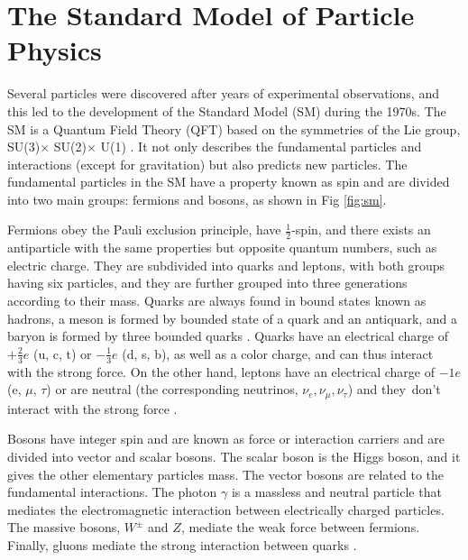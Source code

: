 \chapter{\leavevmode\newline The Standard Model of Particle Physics}
\label{chap:chapter_1}
Several particles were discovered after years of experimental observations, and this led to the development of the Standard Model (SM) during the 1970s. The SM is a Quantum Field Theory (QFT) based on the symmetries of the Lie group, SU(3)$ \times$ SU(2)$ \times$ U(1) \cite{stiller2016full}. It not only describes the fundamental particles and interactions (except for gravitation) but also predicts new particles. The fundamental particles in the SM have a property known as spin and are divided into two main groups: fermions and bosons, as shown in Fig \ref{fig:sm}.

Fermions obey the Pauli exclusion principle, have $\frac{1}{2}$-spin, and there exists an antiparticle with the same properties but opposite quantum numbers, such as electric charge. They are subdivided into quarks and leptons, with both groups having six particles, and they are further grouped into three generations according to their mass. Quarks are always found in bound states known as hadrons, a meson is formed by bounded state of a quark and an antiquark, and a baryon is formed by three bounded quarks \cite{stiller2016full, fedi2016studies, grummer2021search}. Quarks have an electrical charge of $+\frac{2}{3}e$ (u, c, t) or $-\frac{1}{3}e$ (d, s, b), as well as a color charge, and can thus interact with the strong force. On the other hand, leptons have an electrical charge of $-1e$ (e, $\mu$, $\tau$) or are neutral (the corresponding neutrinos, $\nu_e, \nu_\mu, \nu_\tau$) and they don't interact with the strong force \cite{bonanomi2021response, bragagnolo2021measurement}.

Bosons have integer spin and are known as force or interaction carriers and are divided into vector and scalar bosons. The scalar boson is the Higgs boson, and it gives the other elementary particles mass. The vector bosons are related to the fundamental interactions. The photon $\gamma$ is a massless and neutral particle that mediates the electromagnetic interaction between electrically charged particles. The massive bosons, $W^{\pm}$ and $Z$, mediate the weak force between fermions. Finally, gluons mediate the strong interaction between quarks \cite{grummer2021search, bragagnolo2021measurement}.

